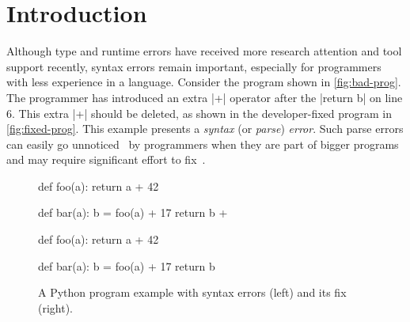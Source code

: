 
\section{Introduction}
\label{sec:intro}

Although type and runtime errors have received more research
attention and tool support recently, syntax errors remain important, especially for
programmers with less experience in a language.
Consider the program shown in \autoref{fig:bad-prog}.
The programmer has introduced an extra |+| operator after the
|return b| on line 6. This extra |+| should be deleted, as shown in the
developer-fixed program in \autoref{fig:fixed-prog}. This
example presents a \emph{syntax} (or \emph{parse}) \emph{error}. Such parse errors can easily
go unnoticed~\citep{Denny_2012, Ahadi_2018} by programmers when they are part of
bigger programs and may require significant effort to fix~\citep{Kummerfeld2003}.


\begin{figure}[h]
\centering
\begin{minipage}[c]{0.48\linewidth}
\begin{ecode}
def foo(a):
  return a + 42

def bar(a):
  b = foo(a) + 17
  return b +
\end{ecode}
\label{fig:bad-prog}
\end{minipage}%
\hspace{0.02\linewidth}%
\begin{minipage}[c]{0.48\linewidth}
\begin{ecode}
def foo(a):
  return a + 42

def bar(a):
  b = foo(a) + 17
  return b
\end{ecode}
\label{fig:fixed-prog}
\end{minipage}
\caption{A Python program example with syntax errors (left) and its fix (right).}
\label{fig:example-prog}
\end{figure}

